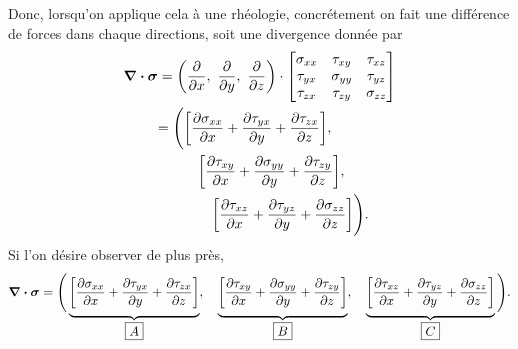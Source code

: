 \documentclass[10pt]{article}
\numberwithin{equation}{section}
\newcommand{\venti}{\vphantom{\sum_x^x}}
\begin{document}
Donc, lorsqu'on applique cela à une rhéologie, concrétement on fait une différence de forces dans chaque directions, soit une divergence donnée par
\begin{align}
   \divergence{\boldsymbol{\sigma}}
   &= \qty(\pdv{}{x},\ \pdv{}{y},\ \pdv{}{z}) \cdot
   \begin{bmatrix}
     \sigma_{xx} & \tau_{xy} & \tau_{xz} \\
     \tau_{yx} & \sigma_{yy} & \tau_{yz} \\
     \tau_{zx} & \tau_{zy} & \sigma_{zz} \\
   \end{bmatrix}\nonumber\\
   &
   \begin{aligned}
    =\Bigg(&\qty[\pdv{\sigma_{xx}}{x}+\pdv{\tau_{yx}}{y}+\pdv{\tau_{zx}}{z}], \\
    &\quad\qty[\pdv{\tau_{xy}}{x}+\pdv{\sigma_{yy}}{y}+\pdv{\tau_{zy}}{z}],\\
    &\quad\quad\qty[\pdv{\tau_{xz}}{x}+\pdv{\tau_{yz}}{y}+\pdv{\sigma_{zz}}{z}] \Bigg).\\
   \end{aligned}
\end{align}
Si l'on désire observer de plus près, 
\begin{equation}
   \divergence{\boldsymbol{\sigma}} =  \Bigg(\underbrace{\venti\qty[\pdv{\sigma_{xx}}{x}+\pdv{\tau_{yx}}{y}+\pdv{\tau_{zx}}{z}]}_{\boxed{A}} ,\quad
   \underbrace{\venti\qty[\pdv{\tau_{xy}}{x}+\pdv{\sigma_{yy}}{y}+\pdv{\tau_{zy}}{z}]}_{\boxed{B}} ,\quad
   \underbrace{\venti\qty[\pdv{\tau_{xz}}{x}+\pdv{\tau_{yz}}{y}+\pdv{\sigma_{zz}}{z}]}_{\boxed{C}} \Bigg).
\end{equation}
\end{document}
